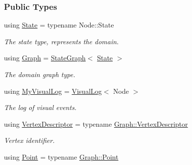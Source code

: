 \subsubsection*{Public Types}
\begin{DoxyCompactItemize}
\item 
using \hyperlink{structDrawer_a885374e914d2706604a45c4615da1a94}{State} = typename Node\+::\+State\hypertarget{structDrawer_a885374e914d2706604a45c4615da1a94}{}\label{structDrawer_a885374e914d2706604a45c4615da1a94}

\begin{DoxyCompactList}\small\item\em The state type, represents the domain. \end{DoxyCompactList}\item 
using \hyperlink{structDrawer_a2a65d4731ffb3bcf0102e830a831e575}{Graph} = \hyperlink{structStateGraph}{State\+Graph}$<$ \hyperlink{structDrawer_a885374e914d2706604a45c4615da1a94}{State} $>$\hypertarget{structDrawer_a2a65d4731ffb3bcf0102e830a831e575}{}\label{structDrawer_a2a65d4731ffb3bcf0102e830a831e575}

\begin{DoxyCompactList}\small\item\em The domain graph type. \end{DoxyCompactList}\item 
using \hyperlink{structDrawer_a92e48b34c17108cc5a5a66ab84ad648b}{My\+Visual\+Log} = \hyperlink{structVisualLog}{Visual\+Log}$<$ Node $>$\hypertarget{structDrawer_a92e48b34c17108cc5a5a66ab84ad648b}{}\label{structDrawer_a92e48b34c17108cc5a5a66ab84ad648b}

\begin{DoxyCompactList}\small\item\em The log of visual events. \end{DoxyCompactList}\item 
using \hyperlink{structDrawer_a5bccdf5b5e846fb1a958dca6b5f0a1f6}{Vertex\+Descriptor} = typename \hyperlink{structStateGraph_a95d7ea26b0d0d07d3488068a8e9be53c}{Graph\+::\+Vertex\+Descriptor}\hypertarget{structDrawer_a5bccdf5b5e846fb1a958dca6b5f0a1f6}{}\label{structDrawer_a5bccdf5b5e846fb1a958dca6b5f0a1f6}

\begin{DoxyCompactList}\small\item\em Vertex identifier. \end{DoxyCompactList}\item 
using \hyperlink{structDrawer_a891606fa8dc76c97b3be46d2e64a8280}{Point} = typename \hyperlink{structStateGraph_acd6bb467c5261e07f777dd1c4ea575c5}{Graph\+::\+Point}\hypertarget{structDrawer_a891606fa8dc76c97b3be46d2e64a8280}{}\label{structDrawer_a891606fa8dc76c97b3be46d2e64a8280}


\end{DoxyCompactItemize}
